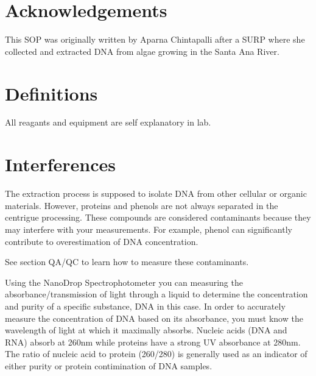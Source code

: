\documentclass[12pt]{../SOP3_beta}\usepackage[]{graphicx}\usepackage[]{xcolor}
\begin{document}
\tableofcontents

\newpage

\section{Acknowledgements}

This SOP was originally written by Aparna Chintapalli after a SURP where she collected and extracted DNA from algae growing in the Santa Ana River.

\section{Definitions}

\NP All reagants and equipment are self explanatory in lab. 

\section{Interferences}

\NP The extraction process is supposed to isolate DNA from other cellular or organic materials. However, proteins and phenols are not always separated in the centrigue processing. These compounds are considered contaminants because they may interfere with your measurements. For example, phenol can significantly contribute to overestimation of DNA concentration.

\NP See section QA/QC to learn how to measure these contaminants.

\NP Using the NanoDrop Spectrophotometer you can measuring the absorbance/transmission of light through a liquid to determine the concentration and purity of a specific substance, DNA in this case. In order to accurately measure the concentration of DNA based on its absorbance, you must know the wavelength of light at which it maximally absorbs. Nucleic acids (DNA and RNA) absorb at 260nm while proteins have a strong UV absorbance at 280nm. The ratio of nucleic acid to protein (260/280) is generally used as an indicator of either purity or protein contimination of DNA samples.
\end{document}
